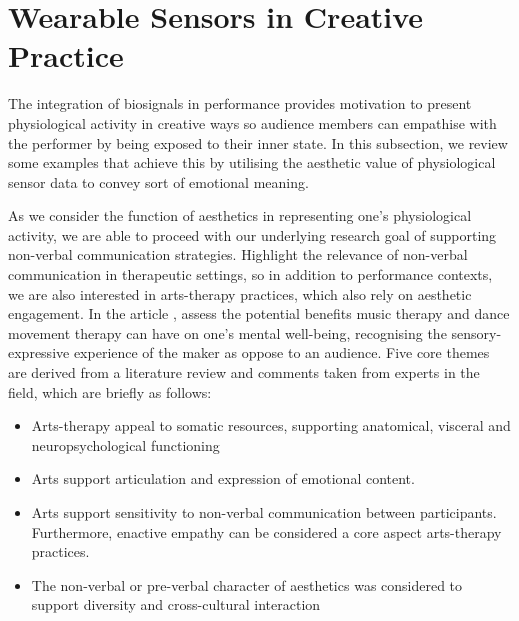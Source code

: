 
\section{Wearable Sensors in Creative Practice}
\label{lit_review:biosignals_creativity}

The integration of biosignals in performance provides motivation to present physiological activity in creative ways so audience members can empathise with the performer by being exposed to their inner state. In this subsection, we review some examples that achieve this by utilising the aesthetic value of physiological sensor data to convey sort of emotional meaning. 

As we consider the function of aesthetics in representing one's physiological activity, we are able to proceed with our underlying research goal of supporting non-verbal communication strategies. Highlight the relevance of non-verbal communication in therapeutic settings, so in addition to performance contexts, we are also interested in arts-therapy practices, which also rely on aesthetic engagement. In the article \cite{samaritter_aesthetic_2018}, \citeauthor{samaritter_aesthetic_2018} assess the potential benefits music therapy and dance movement therapy can have on one's mental well-being, recognising the sensory-expressive experience of the maker as oppose to an audience.  Five core themes are derived from a literature review and comments taken from experts in the field, which are briefly as follows:

\begin{itemize}
\item Arts-therapy appeal to somatic resources, supporting anatomical, visceral and neuropsychological functioning
\item Arts support articulation and expression of emotional content.
\item Arts support sensitivity to non-verbal communication between participants. Furthermore, enactive empathy can be considered a core aspect arts-therapy practices.
\item The non-verbal or pre-verbal character of aesthetics was considered to support diversity and cross-cultural interaction
\end{itemize}

